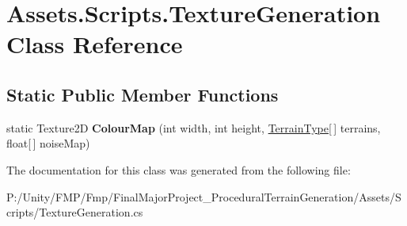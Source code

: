 \hypertarget{class_assets_1_1_scripts_1_1_texture_generation}{}\section{Assets.\+Scripts.\+Texture\+Generation Class Reference}
\label{class_assets_1_1_scripts_1_1_texture_generation}
\subsection*{Static Public Member Functions}
\begin{DoxyCompactItemize}
\item 
\mbox{\label{class_assets_1_1_scripts_1_1_texture_generation_ade921d6d84a0bf5dd63f2cb4afb900f5}} 
static Texture2D {\bfseries Colour\+Map} (int width, int height, \mbox{\hyperlink{struct_assets_1_1_scripts_1_1_terrain_type}{Terrain\+Type}}\mbox{[}$\,$\mbox{]} terrains, float\mbox{[}$\,$\mbox{]} noise\+Map)
\end{DoxyCompactItemize}


The documentation for this class was generated from the following file\+:\begin{DoxyCompactItemize}
\item 
P\+:/\+Unity/\+F\+M\+P/\+Fmp/\+Final\+Major\+Project\+\_\+\+Procedural\+Terrain\+Generation/\+Assets/\+Scripts/Texture\+Generation.\+cs\end{DoxyCompactItemize}
